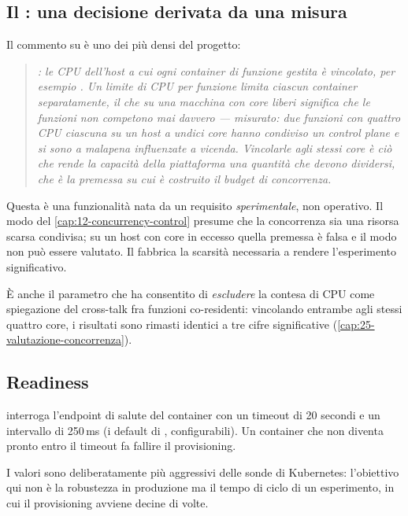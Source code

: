 \subsection{Il : una decisione derivata da una misura}

Il commento su  \`e uno dei pi\`u densi del
progetto:

\begin{quote}\itshape
{}: le CPU dell'host a cui ogni container di funzione gestita \`e
vincolato, per esempio . Un limite di CPU per funzione limita ciascun
container separatamente, il che su una macchina con core liberi significa che le
funzioni non competono mai davvero --- misurato: due funzioni con quattro CPU
ciascuna su un host a undici core hanno condiviso un control plane e si sono a
malapena influenzate a vicenda. Vincolarle agli stessi core \`e ci\`o che rende la
capacit\`a della piattaforma una quantit\`a che devono dividersi, che \`e la
premessa su cui \`e costruito il budget di concorrenza.
\end{quote}

Questa \`e una funzionalit\`a nata da un requisito \emph{sperimentale}, non
operativo. Il modo  del \cref{cap:12-concurrency-control} presume
che la concorrenza sia una risorsa scarsa condivisa; su un host con core in
eccesso quella premessa \`e falsa e il modo non pu\`o essere valutato. Il
 fabbrica la scarsit\`a necessaria a rendere l'esperimento
significativo.

\`E anche il parametro che ha consentito di \emph{escludere} la contesa di CPU
come spiegazione del cross-talk fra funzioni co-residenti: vincolando entrambe
agli stessi quattro core, i risultati sono rimasti identici a tre cifre
significative (\cref{cap:25-valutazione-concorrenza}).

\subsection{Readiness}

 interroga l'endpoint di salute del container con un
timeout di 20 secondi e un intervallo di 250\,ms (i default di
, configurabili). Un container che non diventa
pronto entro il timeout fa fallire il provisioning.

I valori sono deliberatamente pi\`u aggressivi delle sonde di Kubernetes:
l'obiettivo qui non \`e la robustezza in produzione ma il tempo di ciclo di un
esperimento, in cui il provisioning avviene decine di volte.

